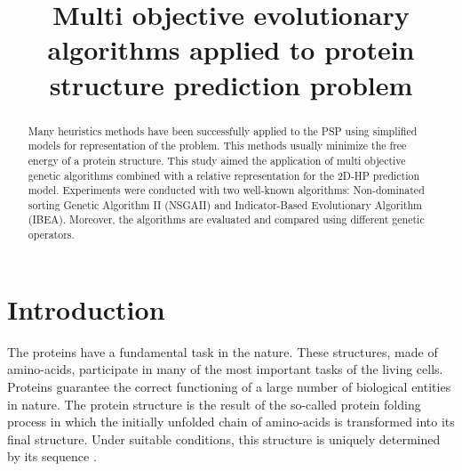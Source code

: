 \documentclass[conference]{IEEEtran}
\begin{document}
	
\title{Multi objective evolutionary algorithms applied to protein structure prediction problem}

\author{
	
	
	}



\maketitle

\begin{abstract}

Many heuristics methods have been successfully applied to the PSP using simplified models for representation of the problem. This methods usually minimize the free energy of a protein structure. This study aimed the application of multi objective genetic algorithms combined with a relative representation for the 2D-HP prediction model. Experiments were conducted with two well-known algorithms: Non-dominated sorting Genetic Algorithm II (NSGAII) and Indicator-Based Evolutionary Algorithm (IBEA). Moreover, the algorithms are evaluated and compared using different genetic operators.

\end{abstract}


\IEEEpeerreviewmaketitle


\section{Introduction}

The proteins have a fundamental task in the nature. These structures, made of amino-acids, participate in many of the most important tasks of the living cells. Proteins guarantee the correct functioning of a large number of biological entities in nature. The protein structure is the result of the so-called protein folding process in which the initially unfolded chain of amino-acids is transformed into its final structure. Under suitable conditions, this structure is uniquely determined by its sequence \cite{}.%
\end{document}
